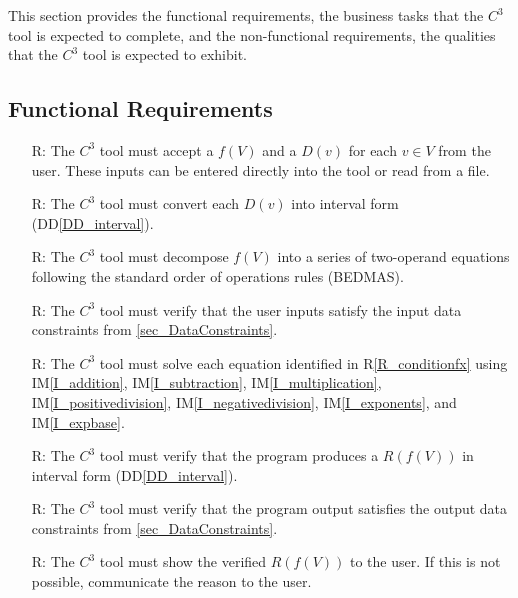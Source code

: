 \documentclass[12pt]{article}
\newcommand{\ddref}[1]{DD\ref{#1}}
\newcommand{\iref}[1]{IM\ref{#1}}
\newcounter{reqnum} %
\newcommand{\rref}[1]{R\ref{#1}}
\newcommand{\prognameAbbrv}{$C^{3}$}
\begin{document}
This section provides the functional requirements, the business tasks that the
\prognameAbbrv{} tool is expected to complete, and the non-functional 
requirements, the qualities that the \prognameAbbrv{} tool is expected to 
exhibit.

\subsection{Functional Requirements}

\noindent \begin{itemize}

\item[R\refstepcounter{reqnum}\thereqnum \label{R_Inputs}:] The 
\prognameAbbrv{} tool must accept a $f(V)$ and a $D(v)$ for each $v \in V$ from 
the user. These inputs can be entered directly into the tool or read from a 
file.

\item[R\refstepcounter{reqnum}\thereqnum \label{R_conditionX}:] The 
\prognameAbbrv{} tool must convert each $D(v)$ into interval form 
(\ddref{DD_interval}).

\item[R\refstepcounter{reqnum}\thereqnum \label{R_conditionfx}:] The 
\prognameAbbrv{} tool must decompose $f(V)$ into a series of two-operand 
equations following the standard order of operations rules (BEDMAS).

\item[R\refstepcounter{reqnum}\thereqnum \label{R_verifyinputs}:] The 
\prognameAbbrv{} tool must verify that the user inputs satisfy the input data 
constraints from \ref{sec_DataConstraints}.

\item[R\refstepcounter{reqnum}\thereqnum \label{R_Calculate}:] The 
\prognameAbbrv{} tool must solve each equation identified in 
\rref{R_conditionfx} using \iref{I_addition}, \iref{I_subtraction}, 
\iref{I_multiplication}, \iref{I_positivedivision}, \iref{I_negativedivision}, 
\iref{I_exponents}, and \iref{I_expbase}.

\item[R\refstepcounter{reqnum}\thereqnum \label{R_VerifyOutput}:] The 
\prognameAbbrv{} tool must verify that the program produces a $R(f(V))$ in 
interval form (\ddref{DD_interval}).

\item[R\refstepcounter{reqnum}\thereqnum \label{R_VerifyOutputConstraints}:] 
The \prognameAbbrv{} tool must verify that the program output satisfies the 
output data constraints from \ref{sec_DataConstraints}.

\item[R\refstepcounter{reqnum}\thereqnum \label{R_Output}:] The 
\prognameAbbrv{} tool must show the verified $R(f(V))$ to the user. If this is 
not possible, communicate the reason to the user.

\end{itemize}
\end{document}
